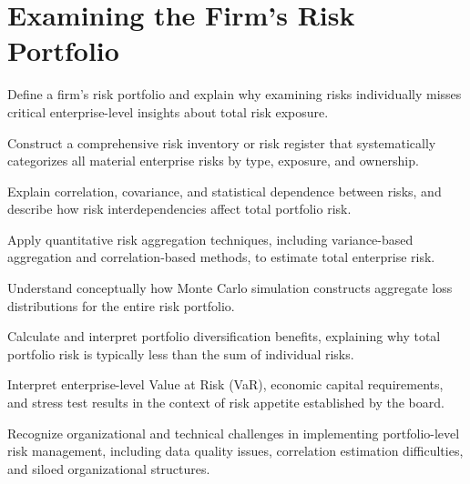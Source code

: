 \documentclass[11pt,openany]{book}
\begin{document}
\setcounter{chapter}{5}
\chapter{Examining the Firm's Risk Portfolio}
\label{chap:risk-portfolio}

\begin{learningobjectives}
  \item Define a firm's risk portfolio and explain why examining risks
        individually misses critical enterprise-level insights about total
        risk exposure.
  \item Construct a comprehensive risk inventory or risk register that
        systematically categorizes all material enterprise risks by type,
        exposure, and ownership.
  \item Explain correlation, covariance, and statistical dependence between
        risks, and describe how risk interdependencies affect total portfolio
        risk.
  \item Apply quantitative risk aggregation techniques, including
        variance-based aggregation and correlation-based methods, to estimate
        total enterprise risk.
  \item Understand conceptually how Monte Carlo simulation constructs
        aggregate loss distributions for the entire risk portfolio.
  \item Calculate and interpret portfolio diversification benefits, explaining
        why total portfolio risk is typically less than the sum of individual
        risks.
  \item Interpret enterprise-level Value at Risk (VaR), economic capital
        requirements, and stress test results in the context of risk appetite
        established by the board.
  \item Recognize organizational and technical challenges in implementing
        portfolio-level risk management, including data quality issues,
        correlation estimation difficulties, and siloed organizational
        structures.
\end{learningobjectives}
\end{document}
